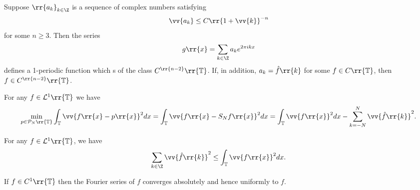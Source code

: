 \documentclass{article}
\begin{document}
\begin{proposition}
  Suppose $\rr{a_k}_{k\in\Z}$ is a sequence of complex numbers satisfying
  \begin{align*}
    \vv{a_k}\leq C\rr{1+\vv{k}}^{-n}
  \end{align*}
  for some $n\geq 3$. Then the series
  \begin{align*}
    g\rr{x}=\sum_{k\in\Z} a_k e^{2\pi ikx}
  \end{align*}
  defines a 1-periodic function which s of the class $C^{\rr{n-2}}\rr{\mathbb T}$. If,
  in addition, $a_k=\hat f\rr{k}$ for some $f\in C\rr{\mathbb T}$, then
  $f\in C^{\rr{n-2}}\rr{\mathbb T}$.
\end{proposition}

\begin{proposition}
  For any $f\in\mathcal L^1\rr{\mathbb T}$ we have
  \begin{align*}
    \min_{p\in\mathcal P_N\rr{\mathbb T}} \int_{\mathbb T}\vv{f\rr{x}-p\rr{x}}^2 dx
    = \int_{\mathbb T}\vv{f\rr{x}-S_Nf\rr{x}}^2dx
    = \int_{\mathbb T}\vv{f\rr{x}}^2dx - \sum_{k=-N}^{ N } \vv{\hat f\rr{k}}^2.
  \end{align*}
\end{proposition}

\begin{corollary}[Bessel]
  For any $f\in\mathcal L^1\rr{\mathbb T}$, we have
  \begin{align*}
    \sum_{k\in\Z}\vv{\hat f\rr{k}}^2 \leq \int_{\mathbb T}\vv{f\rr{x}}^2dx.
  \end{align*}
\end{corollary}

\begin{proposition}
  If $f\in C^1\rr{\mathbb T}$ then the Fourier series of $f$ converges absolutely and hence
  uniformly to $f$.
\end{proposition}
\end{document}
